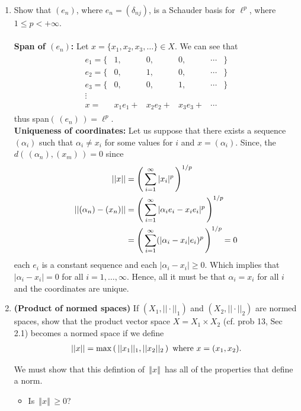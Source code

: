 \documentclass[10pt,a4paper]{report}
\newcommand{\NORM}[1]{\,\left \Vert #1 \right \Vert\,}
\begin{document}
\begin{enumerate}
	\item Show that $(e_n)$, where $e_n=(\delta_{nj})$, is a Schauder basis for $\ell^p$, where $1 \le p < +\infty$.\\
	\\
	\textbf{Span of $(e_n)$:}  Let $x=\{ x_1, x_2, x_3, \dots \} \in X$.  We can see that
	\begin{align*}
		\begin{array}{cccccc}
			e_1 = \{ & 1, & 0, & 0, & \cdots & \} \\
			e_2 = \{ & 0, & 1, & 0, & \cdots  &\} \\
			e_3 = \{ & 0, & 0, & 1, & \cdots  &\} \\
			\vdots \\
			x = & x_1 e_1 + & x_2 e_2 + & x_3 e_3 + & \cdots
		\end{array}
	\end{align*}thus span$(\,(e_n)\,)= \ell^p$.\\
	\textbf{Uniqueness of coordinates:}  Let us suppose that there exists a sequence $( \alpha_i )$ such that $\alpha_i \ne x_i$ for some values for $i$ and $x = (\alpha_i)$.  Since, the $d(\,(\alpha_n),(x_m)\,)=0$ since
	\begin{align*}
		||x|| &= \left (\, \sum_{i=1}^\infty |x_i|^p \,\right )^{1/p} \\
		|| (\alpha_n) - (x_n) || &= \left (\, \sum_{i=1}^\infty |\alpha_i e_i - x_i e_i|^p \,\right )^{1/p} \\
			&= \left (\, \sum_{i=1}^\infty (|\alpha_i - x_i| e_i)^p \,\right )^{1/p} =0
	\end{align*}each $e_i$ is a constant sequence and each $|\alpha_i - x_i| \ge 0$.  Which implies that $|\alpha_i - x_i|=0$ for all $i=1, \dots, \infty$. Hence, all it must be that $\alpha_i = x_i$ for all $i$ and the coordinates are unique.
	
	\setcounter{enumi}{14}
	\item \textbf{(Product of normed spaces)}  If $(X_1,||\cdot||_1)$ and $(X_2, ||\cdot||_2)$ are normed spaces, show that the product vector space $X=X_1\times X_2$ (cf. prob 13, Sec 2.1) becomes a normed space if we define
	\begin{align*}
		 ||x||=\max\left (\, ||x_1||_1, ||x_2||_2 \,\right ) \text{ where } x=(x_1, x_2).
	\end{align*}
	
	We must show that this defintion of $\NORM{x}$ has all of the properties that define a norm.
	\begin{itemize}
		\item Is $\NORM{x} \ge 0$?
		

\end{itemize}
\end{enumerate}
\end{document}

